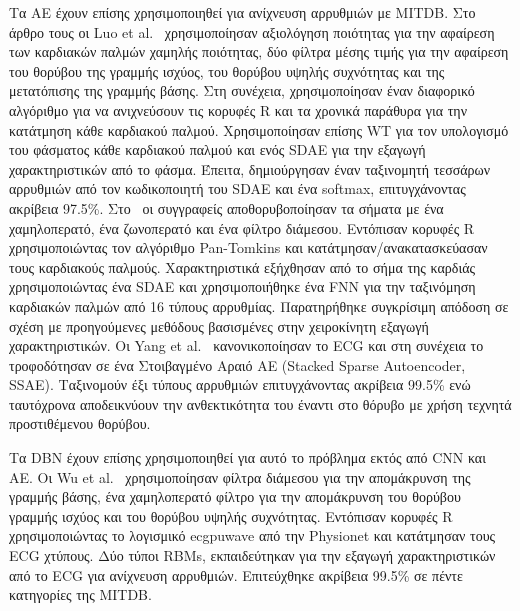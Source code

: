 Τα ΑΕ έχουν επίσης χρησιμοποιηθεί για ανίχνευση αρρυθμιών με MITDB\@.
Στο άρθρο τους οι Luo et al.~\cite{luo2017patient} χρησιμοποίησαν αξιολόγηση ποιότητας για την αφαίρεση των καρδιακών παλμών χαμηλής ποιότητας, δύο φίλτρα μέσης τιμής για την αφαίρεση του θορύβου της γραμμής ισχύος, του θορύβου υψηλής συχνότητας και της μετατόπισης της γραμμής βάσης.
Στη συνέχεια, χρησιμοποίησαν έναν διαφορικό αλγόριθμο για να ανιχνεύσουν τις κορυφές R και τα χρονικά παράθυρα για την κατάτμηση κάθε καρδιακού παλμού.
Χρησιμοποίησαν επίσης WT για τον υπολογισμό του φάσματος κάθε καρδιακού παλμού και ενός SDAE για την εξαγωγή χαρακτηριστικών από το φάσμα.
Έπειτα, δημιούργησαν έναν ταξινομητή τεσσάρων αρρυθμιών από τον κωδικοποιητή του SDAE και ένα softmax, επιτυγχάνοντας ακρίβεια 97.5\%.
Στο~\cite{jiang2017heartbeat} οι συγγραφείς αποθορυβοποίησαν τα σήματα με ένα χαμηλοπερατό, ένα ζωνοπερατό και ένα φίλτρο διάμεσου.
Εντόπισαν κορυφές R χρησιμοποιώντας τον αλγόριθμο Pan-Tomkins και κατάτμησαν/ανακατασκεύασαν τους καρδιακούς παλμούς.
Χαρακτηριστικά εξήχθησαν από το σήμα της καρδιάς χρησιμοποιώντας ένα SDAE και χρησιμοποιήθηκε ένα FNN για την ταξινόμηση καρδιακών παλμών από 16 τύπους αρρυθμίας.
Παρατηρήθηκε συγκρίσιμη απόδοση σε σχέση με προηγούμενες μεθόδους βασισμένες στην χειροκίνητη εξαγωγή χαρακτηριστικών.
Οι Yang et al.~\cite{yang2017novel} κανονικοποίησαν το ECG και στη συνέχεια το τροφοδότησαν σε ένα Στοιβαγμένο Αραιό AE (Stacked Sparse Autoencoder, SSAE).
Ταξινομούν έξι τύπους αρρυθμιών επιτυγχάνοντας ακρίβεια 99.5\% ενώ ταυτόχρονα αποδεικνύουν την ανθεκτικότητα του έναντι στο θόρυβο με χρήση τεχνητά προστιθέμενου θορύβου.

Τα DBN έχουν επίσης χρησιμοποιηθεί για αυτό το πρόβλημα εκτός από CNN και AE\@.
Οι Wu et al.~\cite{wu2016novel} χρησιμοποίησαν φίλτρα διάμεσου για την απομάκρυνση της γραμμής βάσης, ένα χαμηλοπερατό φίλτρο για την απομάκρυνση του θορύβου γραμμής ισχύος και του θορύβου υψηλής συχνότητας.
Εντόπισαν κορυφές R χρησιμοποιώντας το λογισμικό ecgpuwave από την Physionet και κατάτμησαν τους ECG χτύπους.
Δύο τύποι RBMs, εκπαιδεύτηκαν για την εξαγωγή χαρακτηριστικών από το ECG για ανίχνευση αρρυθμιών.
Επιτεύχθηκε ακρίβεια 99.5\% σε πέντε κατηγορίες της MITDB\@.

